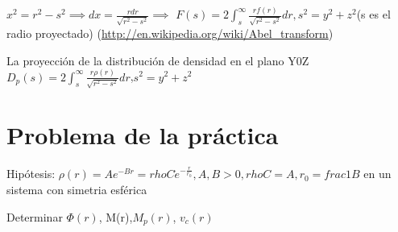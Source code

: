\documentclass[12pt]{book}
\begin{document}
\begin{description}
$x^2 = r^2 - s^2 \implies dx = \frac{r dr}{\sqrt{r^2 - s^2}} \implies$
$F(s) =  2\int_s^\infty{\frac{r f(r)}{\sqrt{r^2-s^2}}dr}, s^2=y^2 + z^2$(s es el radio proyectado) (\url{http://en.wikipedia.org/wiki/Abel\_transform})
\item La proyección de la distribución de densidad en el plano Y0Z $D_p(s) =  2\int_s^\infty{\frac{r \rho(r)}{\sqrt{r^2-s^2}}dr}$,$s^2 = y^2 + z^2$ 

\end{description}

\section*{Problema de la práctica}
\begin{description}
\item Hipótesis: $\rho(r) = Ae^{-Br} = rhoC \dot e^{-\frac{r}{r_0}}, A,B > 0, rhoC = A, r_0=frac{1}{B}$  en un sistema con simetria esférica
\item Determinar $\Phi(r)$, M(r),$M_p(r)$, $v_c(r)$ 

\end{description}
\end{document}
